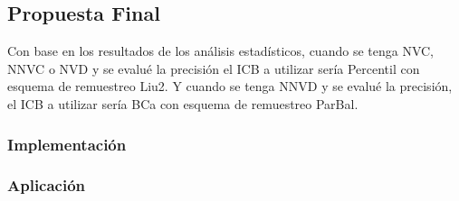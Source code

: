 \subsection{Propuesta Final}

Con base en los resultados de los análisis estadísticos, cuando se tenga NVC, NNVC o NVD y se evalué la precisión el ICB a utilizar sería Percentil con esquema de remuestreo Liu2. Y cuando se tenga NNVD y se evalué la precisión, el ICB a utilizar sería BCa con esquema de remuestreo ParBal.


\subsubsection{Implementación}

\subsubsection{Aplicación}

  